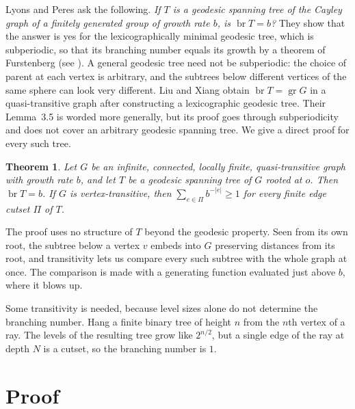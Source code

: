 \documentclass[11pt]{amsart}
\newtheorem{theorem}{Theorem}[section]
\newtheorem{corollary}[theorem]{Corollary}
\theoremstyle{remark}
\DeclareMathOperator{\br}{br}
\begin{document}
Lyons and Peres \cite[Question~3.12]{LP} ask the following. \emph{If $T$ is a geodesic spanning tree of the Cayley graph of a finitely generated group of growth rate $b$, is $\br T=b$?} They show that the answer is yes for the lexicographically minimal geodesic tree, which is subperiodic, so that its branching number equals its growth by a theorem of Furstenberg \cite{Furstenberg1970} (see \cite[Section~3.4]{LP}). A general geodesic tree need not be subperiodic: the choice of parent at each vertex is arbitrary, and the subtrees below different vertices of the same sphere can look very different. Liu and Xiang \cite[Section~3.2]{LX} obtain $\br T=\operatorname{gr}G$ in a quasi-transitive graph after constructing a lexicographic geodesic tree. Their Lemma~3.5 is worded more generally, but its proof goes through subperiodicity and does not cover an arbitrary geodesic spanning tree. We give a direct proof for every such tree.

\begin{theorem}\label{thm:main}
Let $G$ be an infinite, connected, locally finite, quasi-transitive graph with growth rate $b$, and let $T$ be a geodesic spanning tree of $G$ rooted at $o$. Then $\br T=b$. If $G$ is vertex-transitive, then $\sum_{e\in\Pi}b^{-|e|}\ge 1$ for every finite edge cutset $\Pi$ of $T$.
\end{theorem}


The proof uses no structure of $T$ beyond the geodesic property. Seen from its own root, the subtree below a vertex $v$ embeds into $G$ preserving distances from its root, and transitivity lets us compare every such subtree with the whole graph at once. The comparison is made with a generating function evaluated just above $b$, where it blows up.

Some transitivity is needed, because level sizes alone do not determine the branching number. Hang a finite binary tree of height $n$ from the $n$th vertex of a ray. The levels of the resulting tree grow like $2^{n/2}$, but a single edge of the ray at depth $N$ is a cutset, so the branching number is $1$.

\section{Proof}
\end{document}
